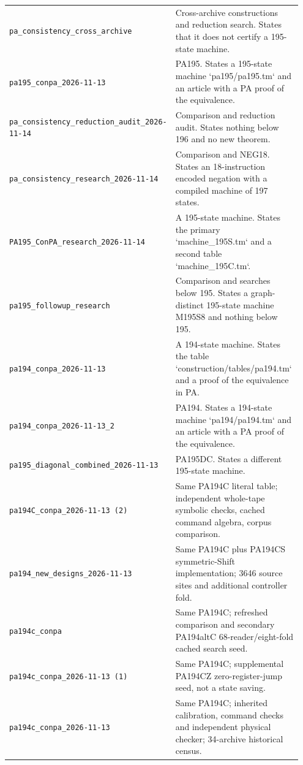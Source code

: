 \begin{longtable}{@{}p{0.40\linewidth}p{0.55\linewidth}@{}}
\nolinkurl{pa_consistency_cross_archive} & Cross-archive constructions and reduction search. States that it does not certify a 195-state machine.\\[4pt]
\nolinkurl{pa195_conpa_2026-11-13} & PA195. States a 195-state machine `pa195/pa195.tm` and an article with a PA proof of the equivalence.\\[4pt]
\nolinkurl{pa_consistency_reduction_audit_2026-11-14} & Comparison and reduction audit. States nothing below 196 and no new theorem.\\[4pt]
\nolinkurl{pa_consistency_research_2026-11-14} & Comparison and NEG18. States an 18-instruction encoded negation with a compiled machine of 197 states.\\[4pt]
\nolinkurl{PA195_ConPA_research_2026-11-14} & A 195-state machine. States the primary `machine\_195S.tm` and a second table `machine\_195C.tm`.\\[4pt]
\nolinkurl{pa195_followup_research} & Comparison and searches below 195. States a graph-distinct 195-state machine M195S8 and nothing below 195.\\[4pt]
\nolinkurl{pa194_conpa_2026-11-13} & A 194-state machine. States the table `construction/tables/pa194.tm` and a proof of the equivalence in PA.\\[4pt]
\nolinkurl{pa194_conpa_2026-11-13_2} & PA194. States a 194-state machine `pa194/pa194.tm` and an article with a PA proof of the equivalence.\\[4pt]
\nolinkurl{pa195_diagonal_combined_2026-11-13} & PA195DC. States a different 195-state machine.\\[4pt]
\nolinkurl{pa194C_conpa_2026-11-13 (2)} & Same PA194C literal table; independent whole-tape symbolic checks, cached command algebra, corpus comparison.\\[4pt]
\nolinkurl{pa194_new_designs_2026-11-13} & Same PA194C plus PA194CS symmetric-Shift implementation; 3646 source sites and additional controller fold.\\[4pt]
\nolinkurl{pa194c_conpa} & Same PA194C; refreshed comparison and secondary PA194altC 68-reader/eight-fold cached search seed.\\[4pt]
\nolinkurl{pa194c_conpa_2026-11-13 (1)} & Same PA194C; supplemental PA194CZ zero-register-jump seed, not a state saving.\\[4pt]
\nolinkurl{pa194c_conpa_2026-11-13} & Same PA194C; inherited calibration, command checks and independent physical checker; 34-archive historical census.\\[4pt]
\bottomrule
\end{longtable}
